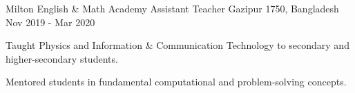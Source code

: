 
\begin{cventries}

  \cventry
    {Milton English \& Math Academy} %
    {Assistant Teacher} %
    {Gazipur 1750, Bangladesh} %
    {Nov 2019 - Mar 2020} %
    {
      \begin{cvitems} %
        \item {Taught Physics and Information \& Communication Technology to secondary and higher-secondary students.}
        \item{Mentored students in fundamental computational and problem-solving concepts.}
      \end{cvitems}
    }

\end{cventries}
